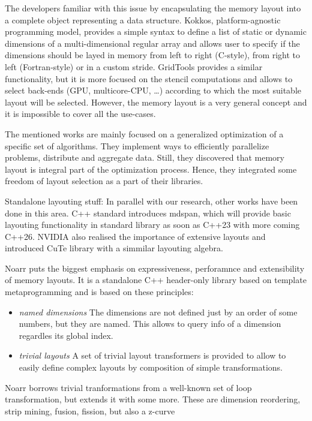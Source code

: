 The developers familiar with this issue by encapsulating the memory layout into a complete object representing a data structure. Kokkos, platform-agnostic programming model, provides a simple syntax to define a list of static or dynamic dimensions of a multi-dimensional regular array and allows user to specify if the dimensions should be layed in memory from left to right (C-style), from right to left (Fortran-style) or in a custom stride.
GridTools provides a similar functionality, but it is more focused on the stencil computations and allows to select back-ends (GPU, multicore-CPU, \dots) according to which the most suitable layout will be selected. However, the memory layout is a very general concept and it is impossible to cover all the use-cases.

The mentioned works are mainly focused on a generalized optimization of a specific set of algorithms. They implement ways to efficiently parallelize problems, distribute and aggregate data. Still, they discovered that memory layout is integral part of the optimization process. Hence, they integrated some freedom of layout selection as a part of their libraries.

Standalone layouting stuff:
In parallel with our research, other works have been done in this area. C++ standard introduces mdspan, which will provide basic layouting functionality in standard library as soon as C++23 with more coming C++26. NVIDIA also realised the importance of extensive layouts and introduced CuTe library with a simmilar layouting algebra.

Noarr puts the biggest emphasis on expressiveness, perforamnce and extensibility of memory layouts. It is a standalone C++ header-only library based on template metaprogramming and is based on these principles:
\begin{itemize}
  \item \emph{named dimensions} The dimensions are not defined just by an order of some numbers, but they are named. This allows to query info of a dimension regardles its global index.
  \item \emph{trivial layouts} A set of trivial layout transformers is provided to allow to easily define complex layouts by composition of simple transformations.
\end{itemize}

Noarr borrows trivial tranformations from a well-known set of loop transformation, but extends it with some more. These are dimension reordering, 
strip mining, fusion, fission, but also a z-curve

